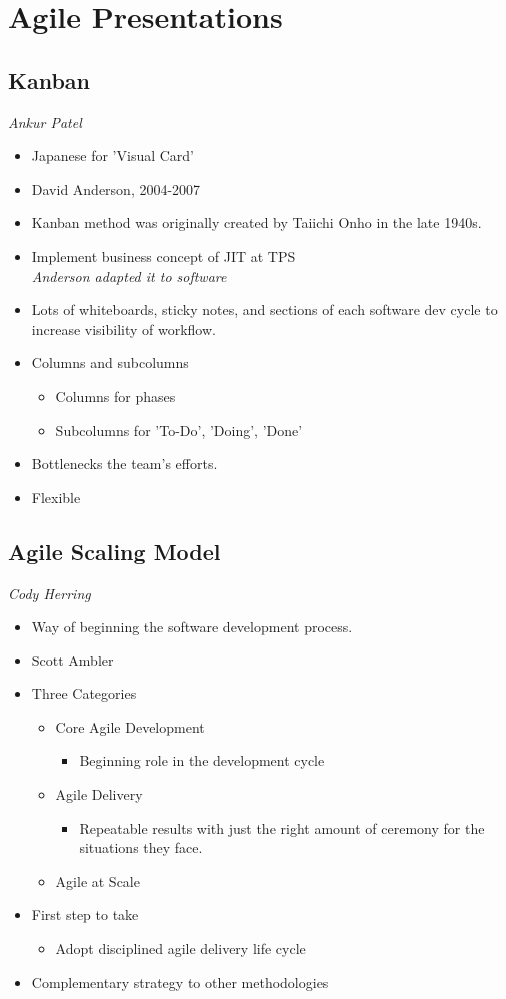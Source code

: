 \documentclass{report}
\begin{document}
	\chapter{Agile Presentations}
		\section{Kanban}
			\textit{Ankur Patel}
			\begin{itemize}
				\item Japanese for 'Visual Card'
				\item David Anderson, 2004-2007
				\item Kanban method was originally created by Taiichi Onho in the late 1940s.
				\item Implement business concept of JIT at TPS\\
					\textit{Anderson adapted it to software}
				\item Lots of whiteboards, sticky notes, and sections of each software dev cycle to increase visibility of workflow.
				\item Columns and subcolumns
					\begin{itemize}
						\item Columns for phases
						\item Subcolumns for 'To-Do', 'Doing', 'Done'
					\end{itemize}
				\item Bottlenecks the team's efforts.
				\item Flexible
			\end{itemize}
		\section{Agile Scaling Model}
			\textit{Cody Herring}
			\begin{itemize}
				\item Way of beginning the software development process.
				\item Scott Ambler
				\item Three Categories
					\begin{itemize}
						\item Core Agile Development
							\begin{itemize}
								\item Beginning role in the development cycle
							\end{itemize}
						\item Agile Delivery
							\begin{itemize}
								\item Repeatable results with just the right amount of ceremony for the situations they face.
							\end{itemize}
						\item Agile at Scale
					\end{itemize}
				\item First step to take
					\begin{itemize}
						\item Adopt disciplined agile delivery life cycle
					\end{itemize}
				\item Complementary strategy to other methodologies
			\end{itemize}
\end{document}
